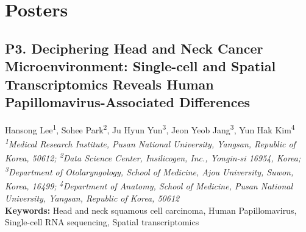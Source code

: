 \chapter{Posters}

\section*{P3. Deciphering Head and Neck Cancer Microenvironment: Single-cell and Spatial Transcriptomics Reveals Human Papillomavirus-Associated Differences}

\begin{center}
Hansong Lee\textsuperscript{1}, Sohee Park\textsuperscript{2}, Ju Hyun Yun\textsuperscript{3}, Jeon Yeob Jang\textsuperscript{3}, Yun Hak Kim\textsuperscript{4} \\
\vspace{0.3cm}
\textit{\textsuperscript{1}Medical Research Institute, Pusan National University, Yangsan, Republic of Korea, 50612; \textsuperscript{2}Data Science Center, Insilicogen, Inc., Yongin-si 16954, Korea; \textsuperscript{3}Department of Otolaryngology, School of Medicine, Ajou University, Suwon, Korea, 16499; \textsuperscript{4}Department of Anatomy, School of Medicine, Pusan National University, Yangsan, Republic of Korea, 50612} \\
\vspace{0.3cm}
\textbf{Keywords:} Head and neck squamous cell carcinoma, Human Papillomavirus, Single-cell RNA sequencing, Spatial transcriptomics
\end{center}

